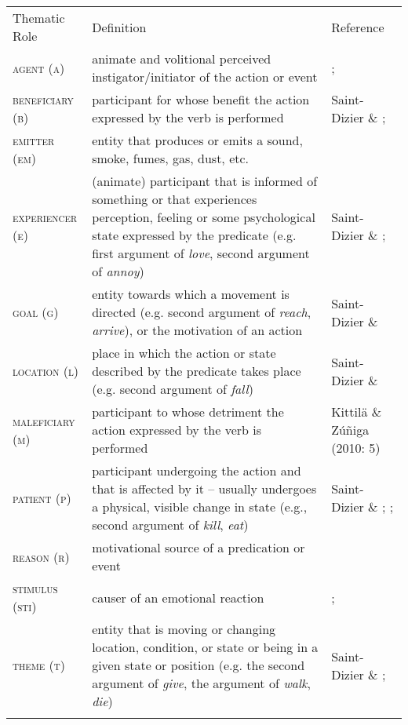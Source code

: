 \documentclass[output=paper]{langsci/langscibook}
\begin{document}
\begin{tabularx}{\textwidth}{XXX}
\lsptoprule
{ Thematic Role} & { Definition} & { Reference}\\
{ \textsc{agent (a)}} & { animate and volitional perceived instigator/initiator of the action or event} & { \citet{Fillmore1968}; \citet[49]{Payne1997}}\\
{ \textsc{beneficiary (b)}} & { participant for whose benefit the action expressed by the verb is performed} & { Saint-Dizier \& \citet[11]{Viegas1995}; \citet[4]{PalmerEtAl2010}}\\
{ \textsc{emitter (em)}} & { entity that produces or emits a sound, smoke, fumes, gas, dust, etc.} & \\
{ \textsc{experiencer (e)}} & { (animate) participant that is informed of something or that experiences perception, feeling or some psychological state expressed by the predicate (e.g. first argument of \textit{love}, second argument of \textit{annoy})} & { Saint-Dizier \& \citet[11]{Viegas1995}; \citet[113]{Lobner2002}}\\
{ \textsc{goal (g)}} & { entity towards which a movement is directed (e.g. second argument of \textit{reach}, \textit{arrive}), or the motivation of an action} & { Saint-Dizier \& \citet[11]{Viegas1995}}\\
{ \textsc{location (l)}} & { place in which the action or state described by the predicate takes place (e.g. second argument of \textit{fall})} & { Saint-Dizier \& \citet[11]{Viegas1995}}\\
{ \textsc{maleficiary (m)}} & { participant to whose detriment the action expressed by the verb is performed } & { Kittilä \& Zúñiga (2010: 5)}\\
{ \textsc{patient (p)}} & { participant undergoing the action and that is affected by it – usually undergoes a physical, visible change in state (e.g., second argument of \textit{kill}, \textit{eat}) } & { Saint-Dizier \& \citet[11]{Viegas1995}; \citet[4]{PalmerEtAl2010}; \citet[51]{Payne1997}}\\
{ \textsc{reason (r)}} & { motivational source of a predication or event} & { \citet[225]{Frawley1992}}\\
{ \textsc{stimulus (sti)}} & { causer of an emotional reaction} & { \citet[13]{PalmerEtAl2010}; \citet{Dowty1991}}\\
{ \textsc{theme (t)}} & { entity that is moving or changing location, condition, or state or being in a given state or position (e.g. the second argument of \textit{give}, the argument of \textit{walk}, \textit{die})} & { Saint-Dizier \& \citet[11]{Viegas1995}; \citet[4]{PalmerEtAl2010}}\\
\lspbottomrule
\end{tabularx}
\end{document}
